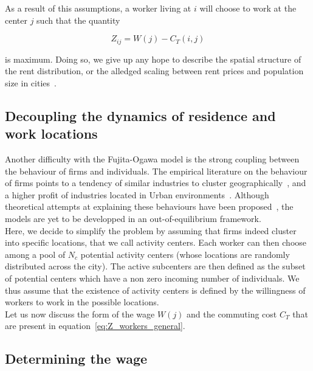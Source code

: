 As a result of this assumptions, a worker living at $i$
will choose to work at the center $j$ such that the quantity
 
\begin{equation}
    Z_{ij} = W(j) - C_T(i,j)
    \label{eq:Z_workers_general}
\end{equation}

is maximum. Doing so, we give up any hope to describe the spatial structure of the rent
distribution, or the alledged scaling between rent prices and population size in
cities~\cite{Bettencourt:2013}.

\subsection{Decoupling the dynamics of residence and work locations}
\label{sub:decoupling_the_dynamics_of_}

Another difficulty with the Fujita-Ogawa model is the strong coupling between
the behaviour of firms and individuals. The empirical literature on the
behaviour of firms points to a tendency of similar industries to cluster
geographically~\cite{Duranton:2005, Marcon:2009}, and a higher
profit of industries located in Urban environments~\cite{Melo:2009}. Although
theoretical attempts at explaining these behaviours have been
proposed~\cite{Duranton:2004}, the models are yet to be developped in an
out-of-equilibrium framework.\\

Here, we decide to simplify the problem by assuming that firms indeed cluster
into specific locations, that we call activity centers. Each worker can then
choose among a pool of $N_c$ potential activity centers (whose locations are
randomly distributed across the city). The active subcenters are then
defined as the subset of potential centers which have a non zero incoming number
of individuals. We thus assume that the existence of activity centers is defined
by the willingness of workers to work in the possible locations.\\


Let us now discuss the form of the wage $W(j)$ and the commuting cost $C_T$ that are
present in equation~\ref{eq:Z_workers_general}. 

\subsection{Determining the wage}
\label{sub:determining_the_wage}

